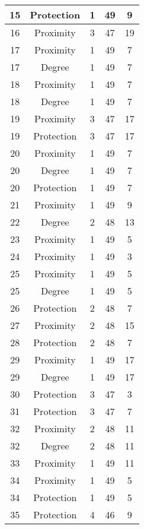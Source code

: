 \documentclass[results.tex]{subfiles}
\begin{document}
\begin{center}
\begin{tabular}{| c || c | c | c | c |}
    15 & Protection & 1 & 49 & 9 \\ 
    \hline
    16 & Proximity & 3 & 47 & 19 \\ 
    \hline
    17 & Proximity & 1 & 49 & 7 \\ 
    \hline
    17 & Degree & 1 & 49 & 7 \\ 
    \hline
    18 & Proximity & 1 & 49 & 7 \\ 
    \hline
    18 & Degree & 1 & 49 & 7 \\ 
    \hline
    19 & Proximity & 3 & 47 & 17 \\ 
    \hline
    19 & Protection & 3 & 47 & 17 \\ 
    \hline
    20 & Proximity & 1 & 49 & 7 \\ 
    \hline
    20 & Degree & 1 & 49 & 7 \\ 
    \hline
    20 & Protection & 1 & 49 & 7 \\ 
    \hline
    21 & Proximity & 1 & 49 & 9 \\ 
    \hline
    22 & Degree & 2 & 48 & 13 \\ 
    \hline
    23 & Proximity & 1 & 49 & 5 \\ 
    \hline
    24 & Proximity & 1 & 49 & 3 \\ 
    \hline
    25 & Proximity & 1 & 49 & 5 \\ 
    \hline
    25 & Degree & 1 & 49 & 5 \\ 
    \hline
    26 & Protection & 2 & 48 & 7 \\ 
    \hline
    27 & Proximity & 2 & 48 & 15 \\ 
    \hline
    28 & Protection & 2 & 48 & 7 \\ 
    \hline
    29 & Proximity & 1 & 49 & 17 \\ 
    \hline
    29 & Degree & 1 & 49 & 17 \\ 
    \hline
    30 & Protection & 3 & 47 & 3 \\ 
    \hline
    31 & Protection & 3 & 47 & 7 \\ 
    \hline
    32 & Proximity & 2 & 48 & 11 \\ 
    \hline
    32 & Degree & 2 & 48 & 11 \\ 
    \hline
    33 & Proximity & 1 & 49 & 11 \\ 
    \hline
    34 & Proximity & 1 & 49 & 5 \\ 
    \hline
    34 & Protection & 1 & 49 & 5 \\ 
    \hline
    35 & Protection & 4 & 46 & 9 \\ 
    \hline

\end{tabular}
\end{center}
\end{document}
